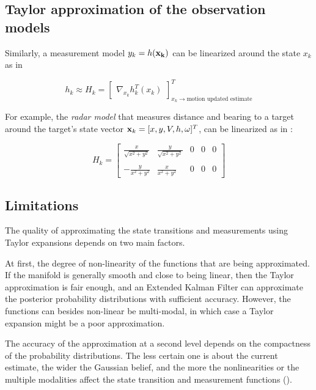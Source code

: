 \subsection{Taylor approximation of the observation models}


Similarly, a measurement model ${{y}}_k=h(\mathbf{x_k})$ can be linearized around the state $x_{k}$ as in 


\begin{equation}
\label{eq:linearize_jacobian2}
h_{k} \approx H_{k} =
\begin{bmatrix}
\nabla_{x_{k}} h_{k}^{T}(x_{k})
\end{bmatrix}_{x_{k} \rightarrow\text{motion updated estimate}}^{T}
\end{equation}

For example, the \emph{radar model} that measures distance and bearing  to a target around the target's state vector $\mathbf{x}_k = [x,y,{V},h,{\omega}]^T$, can be linearized as in :


\begin{equation}
\label{eq:linearize_radar}
H_k =
\begin{bmatrix}
\frac{x}{\sqrt{x^2+y^2}} &\frac{y}{\sqrt{x^2+y^2}} &0 &0 &0 \\\\
-\frac{y}{x^2+y^2} &\frac{x}{x^2+y^2} &0 &0 &0
\end{bmatrix}
\end{equation}

\subsection{Limitations}\label{ssec:EKFlimitations}
The quality of approximating the state transitions and measurements using Taylor expansions depends on two main factors. 


At first, the degree of non-linearity of the functions that are being approximated. If the manifold is generally smooth and close to being linear, then the Taylor approximation is fair enough, and an Extended Kalman Filter can approximate the posterior probability distributions with sufficient accuracy. However, the functions can besides non-linear be multi-modal, in which case a Taylor expansion might be a poor approximation. 


The accuracy of the approximation at a second level depends on the compactness of the probability distributions. The less certain one is about the current estimate, the wider the Gaussian belief, and the more the nonlinearities or the multiple modalities affect the state transition and measurement functions ().

